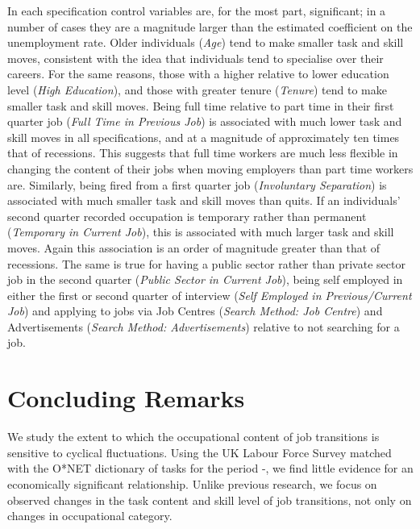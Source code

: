 \documentclass[11pt, oneside]{article}
\begin{document}
\vspace{2mm}

In each specification control variables are, for the most part, significant; in a number of cases they are a magnitude larger than the estimated coefficient on the unemployment rate. Older individuals (\textit{Age}) tend to make smaller task and skill moves, consistent with the idea that individuals tend to specialise over their careers. For the same reasons, those with a higher relative to lower education level (\textit{High Education}), and those with greater tenure  (\textit{Tenure}) tend to make smaller task and skill moves. Being full time relative to part time in their first quarter job (\textit{Full Time in Previous Job}) is associated with much lower task and skill moves in all specifications, and at a magnitude of approximately ten times that of recessions. This suggests that full time workers are much less flexible in changing the content of their jobs when moving employers than part time workers are. Similarly, being fired from a first quarter job (\textit{Involuntary Separation}) is associated with much smaller task and skill moves than quits.
If an individuals' second quarter recorded occupation is temporary rather than permanent (\textit{Temporary in Current Job}), this is associated with much larger task and skill moves. Again this association is an order of magnitude greater than that of recessions. The same is true for having a public sector rather than private sector job in the second quarter (\textit{Public Sector in Current Job}), being self employed in either the first or second quarter of interview (\textit{Self Employed in Previous/Current Job}) and applying to jobs via Job Centres (\textit{Search Method: Job Centre}) and Advertisements (\textit{Search Method: Advertisements}) relative to not searching for a job.
	

	\section{Concluding Remarks}
	\label{sec:Conclusion}
	
We study the extent to which the occupational content of job transitions is sensitive to cyclical fluctuations. Using the UK Labour Force Survey matched with the O*NET dictionary of tasks for the period \hspace{-1mm}-\hspace{-1mm}, we find little evidence for an economically significant relationship. Unlike previous research, we focus on observed changes in the task content and skill level of job transitions, not only on changes in occupational category. 
\end{document}
